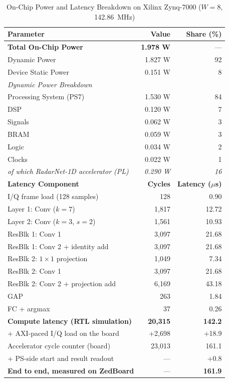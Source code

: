 \documentclass[conference]{IEEEtran}
\begin{document}
\begin{table}[t]
\renewcommand{\arraystretch}{1.15}
\caption{On-Chip Power and Latency Breakdown on Xilinx Zynq-7000 ($W{=}8$, 142.86~MHz)}
\label{tab:power}
\centering
\footnotesize
\begin{tabular}{lrr}
\toprule
\textbf{Parameter} & \textbf{Value} & \textbf{Share (\%)} \\
\midrule
\textbf{Total On-Chip Power} & \textbf{1.978 W} & --- \\
\quad Dynamic Power & 1.827 W & 92 \\
\quad Device Static Power & 0.151 W & 8 \\
\midrule
\multicolumn{3}{l}{\textit{Dynamic Power Breakdown}} \\
\quad Processing System (PS7) & 1.530 W & 84 \\
\quad DSP & 0.120 W & 7 \\
\quad Signals & 0.062 W & 3 \\
\quad BRAM & 0.059 W & 3 \\
\quad Logic & 0.034 W & 2 \\
\quad Clocks & 0.022 W & 1 \\
\midrule
\quad \textit{of which RadarNet-1D accelerator (PL)} & \textit{0.290 W} & \textit{16} \\
\midrule[\heavyrulewidth]
\textbf{Latency Component} & \textbf{Cycles} & \textbf{Latency ($\mu$s)} \\
\midrule
I/Q frame load (128 samples) & 128 & 0.90 \\
Layer 1: Conv ($k{=}7$) & 1,817 & 12.72 \\
Layer 2: Conv ($k{=}3$, $s{=}2$) & 1,561 & 10.93 \\
ResBlk 1: Conv 1 & 3,097 & 21.68 \\
ResBlk 1: Conv 2 + identity add & 3,097 & 21.68 \\
ResBlk 2: $1\times1$ projection & 1,049 & 7.34 \\
ResBlk 2: Conv 1 & 3,097 & 21.68 \\
ResBlk 2: Conv 2 + projection add & 6,169 & 43.18 \\
GAP & 263 & 1.84 \\
FC + argmax & 37 & 0.26 \\
\midrule
\textbf{Compute latency (RTL simulation)} & \textbf{20,315} & \textbf{142.2} \\
\quad + AXI-paced I/Q load on the board & +2,698 & +18.9 \\
\quad Accelerator cycle counter (board) & 23,013 & 161.1 \\
\quad + PS-side start and result readout & --- & +0.8 \\
\textbf{End to end, measured on ZedBoard} & --- & \textbf{161.9} \\
\bottomrule
\end{tabular}


\end{table}
\end{document}
